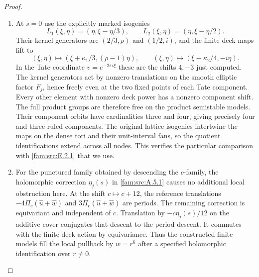 \begin{proof}
\begin{enumerate}[label=\arabic*.,leftmargin=*]
\item At $s=0$ use the explicitly marked isogenies
\[
 L_1(\xi,\eta)=(\eta,\xi-\eta/3),\qquad
 L_2(\xi,\eta)=(\eta,\xi-\eta/2).
\]
Their kernel generators are $(2/3,\rho)$ and $(1/2,i)$,
and the finite deck maps lift to
\[
 (\xi,\eta)\mapsto(\xi+\kappa_1/3,(\rho-1)\eta),
 \qquad
 (\xi,\eta)\mapsto(\xi-\kappa_2/4,-i\eta).
\]
In the Tate coordinate $v=e^{-2\pi i\xi}$ these are the
shifts $4,-3$ just computed. The kernel generators act
by nonzero translations on the smooth elliptic factor
$F_j$, hence freely even at the two fixed points of each
Tate component. Every other element with nonzero deck
power has a nonzero component shift. The full product
groups are therefore free on the product semistable
models. Their component orbits have cardinalities three
and four, giving precisely four and three ruled
components. The original lattice isogenies intertwine
the maps on the dense tori and their unit-interval fans,
so the quotient identifications extend across all nodes.
This verifies the particular comparison with \cref{fam:src:E.2.1} that
we use.

\item For the punctured family obtained by descending the
$c$-family, the holomorphic correction $\eta_j(s)$ in
\cref{fam:src:A.5.1} causes no additional local obstruction here. At the
shift $c\mapsto c+12$, the reference translations
$-4\Pi_c(\widehat u+\widehat w)$ and
$3\Pi_c(\widehat u+\widehat w)$ are periods.
The remaining correction is equivariant and independent
of $c$. Translation by $-c\eta_j(s)/12$ on the additive
cover conjugates that descent to the period descent.
It commutes with the finite deck action by equivariance.
Thus the constructed finite models fill the local
pullback by $w=r^6$ after a specified holomorphic
identification over $r\ne0$. 
\end{enumerate}
\end{proof}

